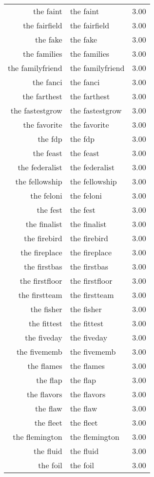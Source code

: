 \begin{table}[ht]
\begin{tabular}{rlr}
  the faint & the faint & 3.00 \\ 
  the fairfield & the fairfield & 3.00 \\ 
  the fake & the fake & 3.00 \\ 
  the families & the families & 3.00 \\ 
  the familyfriend & the familyfriend & 3.00 \\ 
  the fanci & the fanci & 3.00 \\ 
  the farthest & the farthest & 3.00 \\ 
  the fastestgrow & the fastestgrow & 3.00 \\ 
  the favorite & the favorite & 3.00 \\ 
  the fdp & the fdp & 3.00 \\ 
  the feast & the feast & 3.00 \\ 
  the federalist & the federalist & 3.00 \\ 
  the fellowship & the fellowship & 3.00 \\ 
  the feloni & the feloni & 3.00 \\ 
  the fest & the fest & 3.00 \\ 
  the finalist & the finalist & 3.00 \\ 
  the firebird & the firebird & 3.00 \\ 
  the fireplace & the fireplace & 3.00 \\ 
  the firstbas & the firstbas & 3.00 \\ 
  the firstfloor & the firstfloor & 3.00 \\ 
  the firstteam & the firstteam & 3.00 \\ 
  the fisher & the fisher & 3.00 \\ 
  the fittest & the fittest & 3.00 \\ 
  the fiveday & the fiveday & 3.00 \\ 
  the fivememb & the fivememb & 3.00 \\ 
  the flames & the flames & 3.00 \\ 
  the flap & the flap & 3.00 \\ 
  the flavors & the flavors & 3.00 \\ 
  the flaw & the flaw & 3.00 \\ 
  the fleet & the fleet & 3.00 \\ 
  the flemington & the flemington & 3.00 \\ 
  the fluid & the fluid & 3.00 \\ 
  the foil & the foil & 3.00 \\ 

\end{tabular}
\end{table}
